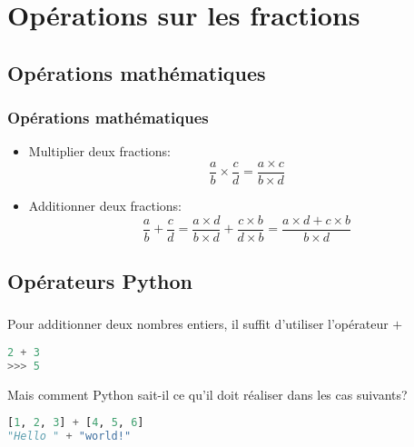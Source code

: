 \documentclass[svgnames,11pt]{beamer}
\begin{document}
\section{Opérations sur les fractions}
\subsection{Opérations mathématiques}
\begin{frame}
    \frametitle{Opérations mathématiques}

    \begin{itemize}
        \item<1-> Multiplier deux fractions:
        $$\frac{a}{b}×\frac{c}{d}=\frac{a×c}{b×d}$$
        \item<2-> Additionner deux fractions:
        $$\frac{a}{b}+\frac{c}{d}=\frac{a×d}{b×d}+\frac{c×b}{d×b}=\frac{a×d+c×b}{b×d}$$
    \end{itemize}

\end{frame}
\subsection{Opérateurs Python}
\begin{frame}[fragile]
    \frametitle{}

    Pour additionner deux nombres entiers, il suffit d'utiliser l'opérateur $+$
\begin{center}
\begin{lstlisting}[language=Python , basicstyle=\ttfamily\small, xleftmargin=2em, xrightmargin=1em]
2 + 3
>>> 5
\end{lstlisting}
\end{center}
Mais comment Python sait-il ce qu'il doit réaliser dans les cas suivants?
\begin{center}
\begin{lstlisting}[language=Python , basicstyle=\ttfamily\small, xleftmargin=2em, xrightmargin=1em]
[1, 2, 3] + [4, 5, 6]
"Hello " + "world!"
\end{lstlisting}
\label{CODE}
\end{center}

\end{frame}
\end{document}
